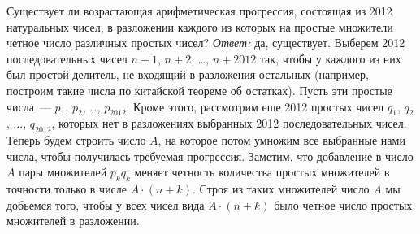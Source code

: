 \problem{}
Существует ли возрастающая арифметическая прогрессия, состоящая из 2012
натуральных чисел, в разложении каждого из которых на простые множители четное
число различных простых чисел?
\solution
\emph{Ответ:} да, существует.
Выберем 2012 последовательных чисел $n + 1$, $n + 2$, \ldots, $n + 2012$ так,
чтобы у каждого из них был простой делитель, не входящий в разложения остальных
(например, построим такие числа по китайской теореме об остатках).
Пусть эти простые числа~--- $p_1$, $p_2$, \ldots, $p_{2012}$.
Кроме этого, рассмотрим еще 2012 простых чисел
$q_1$, $q_2$, $\ldots$, $q_{2012}$,
которых нет в разложениях выбранных 2012 последовательных чисел.
Теперь будем строить число $A$, на которое потом умножим все выбранные нами
числа, чтобы получилась требуемая прогрессия.
Заметим, что добавление в число $A$ пары множителей $p_k q_k$ меняет четность
количества простых множителей в точности только в числе $A \cdot (n + k)$.
Строя из таких множителей число $A$ мы добьемся того, чтобы у всех чисел вида
$A \cdot (n + k)$ было четное число простых множителей в разложении.
\endproblem
